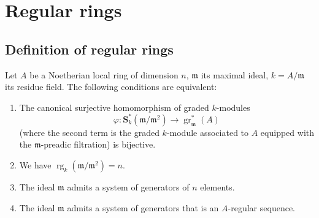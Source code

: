 \section{Regular rings}
\label{section:0.17}

\subsection{Definition of regular rings}
\label{subsection:0.17.1}

\begin{proposition}[17.1.1]
\label{0.17.1.1}
Let $A$ be a Noetherian local ring of dimension $n$, $\mathfrak{m}$ its maximal ideal, $k=A/\mathfrak{m}$ its residue field.
The following conditions are equivalent:
\begin{enumerate}
  \item[{\rm a)}] The canonical surjective homomorphism of graded $k$-modules 
  \[
    \varphi:\mathbf{S}^*_k(\mathfrak{m}/\mathfrak{m}^2)\to\operatorname{gr}^*_\mathfrak{m}(A)
  \]
  (where the second term is the graded $k$-module associated to $A$ equipped with the $\mathfrak{m}$-preadic filtration) is bijective.
  \item[{\rm b)}] We have $\operatorname{rg}_k(\mathfrak{m}/\mathfrak{m}^2)=n$.
  \item[{\rm c)}] The ideal $\mathfrak{m}$ admits a system of generators of $n$ elements.
  \item[{\rm d)}] The ideal $\mathfrak{m}$ admits a system of generators that is an $A$-regular sequence.
\end{enumerate}
\end{proposition}

